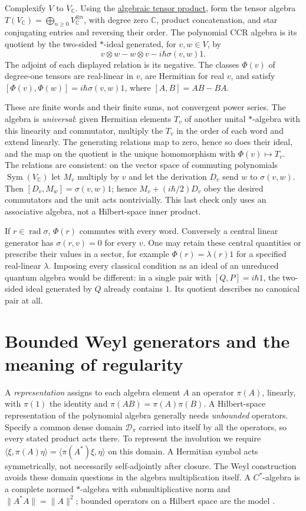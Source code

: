 \begin{definition}\label{f:polynomial-ccr}
Complexify $V$ to $V_{\mathbb C}$. Using the \hyperref[f:tensor-product]{algebraic tensor product}, form the tensor algebra $T(V_{\mathbb C})=\bigoplus_{n\ge0}V_{\mathbb C}^{\otimes n}$, with degree zero $\mathbb C$, product concatenation, and star conjugating entries and reversing their order. The polynomial CCR algebra is its quotient by the two-sided $*$-ideal generated, for $v,w\in V$, by
\[
 v\otimes w-w\otimes v-i\hbar\sigma(v,w)1 .
\]
The adjoint of each displayed relation is its negative. The classes $\Phi(v)$ of degree-one tensors are real-linear in $v$, are Hermitian for real $v$, and satisfy $[\Phi(v),\Phi(w)]=i\hbar\sigma(v,w)1$, where $[A,B]=AB-BA$.
\end{definition}
These are finite words and their finite sums, not convergent power series. The algebra is \emph{universal}: given Hermitian elements $T_v$ of another unital $*$-algebra with this linearity and commutator, multiply the $T_v$ in the order of each word and extend linearly. The generating relations map to zero, hence so does their ideal, and the map on the quotient is the unique homomorphism with $\Phi(v)\mapsto T_v$. The relations are consistent: on the vector space of commuting polynomials $\operatorname{Sym}(V_{\mathbb C})$ let $M_v$ multiply by $v$ and let the derivation $D_v$ send $w$ to $\sigma(v,w)$. Then $[D_v,M_w]=\sigma(v,w)1$; hence $M_v+(i\hbar/2)D_v$ obey the desired commutators and the unit acts nontrivially. This last check only uses an associative algebra, not a Hilbert-space inner product.

If $r\in\operatorname{rad}\sigma$, $\Phi(r)$ commutes with every word. Conversely a central linear generator has $\sigma(r,v)=0$ for every $v$. One may retain these central quantities or prescribe their values in a sector, for example $\Phi(r)=\lambda(r)1$ for a specified real-linear $\lambda$. Imposing every classical condition as an ideal of an unreduced quantum algebra would be different: in a single pair with $[Q,P]=i\hbar 1$, the two-sided ideal generated by $Q$ already contains $1$. Its quotient describes no canonical pair at all.

\section{Bounded Weyl generators and the meaning of regularity}
A \emph{representation} assigns to each algebra element $A$ an operator $\pi(A)$, linearly, with $\pi(1)$ the identity and $\pi(AB)=\pi(A)\pi(B)$. A Hilbert-space representation of the polynomial algebra generally needs \emph{unbounded} operators. Specify a common dense domain $\mathcal D_\pi$ carried into itself by all the operators, so every stated product acts there. To represent the involution we require $\langle\xi,\pi(A)\eta\rangle=\langle\pi(A^*)\xi,\eta\rangle$ on this domain. A Hermitian symbol acts symmetrically, not necessarily self-adjointly after closure. The Weyl construction avoids these domain questions in the algebra multiplication itself. A $C^*$-algebra is a complete normed $*$-algebra with submultiplicative norm and $\|A^*A\|=\|A\|^2$; bounded operators on a Hilbert space are the model \cite{BR}.

